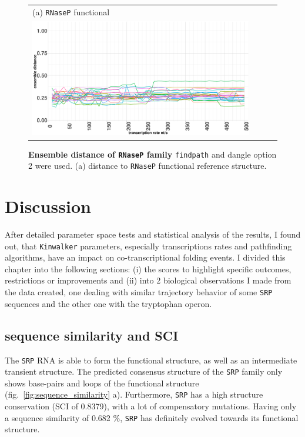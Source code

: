 \documentclass[ twoside,openright,titlepage,numbers=noenddot,headinclude,%
                footinclude=false, cleardoublepage=empty,abstractoff, %
                BCOR=5mm,paper=a4,fontsize=11pt,%
                ngerman,american,%
                ]{scrreprt}
\begin{document}
\begin{figure}
\begin{tabular}{l}
(a) \texttt{RNaseP} functional \\
\includegraphics[width=0.9\textwidth]{./pictures/ensembleDistance/ensembleDistance_RNAseP.pdf}\\
\end{tabular}
\caption{{\bf Ensemble distance of \texttt{RNaseP} family}
\texttt{findpath} and dangle option 2 were used.
(a) distance to \texttt{RNaseP} functional reference structure. 
}
\label{fig:ensembleDistanceRNAseP}
\end{figure}
	
	

\FloatBarrier				

\chapter{Discussion}


After detailed parameter space tests and statistical analysis of the
results, I found out, that \texttt{Kinwalker} parameters, especially
transcriptions rates and pathfinding algorithms, have an impact
on co-transcriptional folding events. I divided this chapter into the following
sections: (i) the scores to highlight specific outcomes, restrictions or
improvements and (ii) into 2 biological observations I made from the data
created, one dealing with similar trajectory behavior of some \texttt{SRP} sequences
and the other one with the tryptophan operon.

\section{sequence similarity and SCI}


The \texttt{SRP} RNA is able to form the functional structure, as well as an intermediate transient structure.
The predicted consensus structure of the \texttt{SRP} family only shows base-pairs and loops of the functional structure (fig.~\ref{fig:sequence_similarity} a).
Furthermore, \texttt{SRP} has a high structure conservation (SCI of 0.8379), with a lot of compensatory mutations. Having only a sequence similarity of 0.682 \%, \texttt{SRP} has definitely evolved towards its functional structure. 
\end{document}
